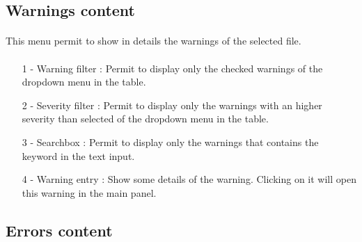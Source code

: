 \documentclass{article}
\begin{document}
\newpage


\subsection{Warnings content}
\vspace{\baselineskip}

\paragraph{}

\vspace{\baselineskip}

\paragraph{}
This menu permit to show in details the warnings of the selected file.

\paragraph{}
\begin{itemize}
	\item[1 -] Warning filter : Permit to display only the checked warnings of the dropdown menu in the table.
    \item[2 -] Severity filter : Permit to display only the warnings with an higher severity than selected of the dropdown menu in the table.
    \item[3 -] Searchbox : Permit to display only the warnings that contains the keyword in the text input.
    \item[4 -] Warning entry : Show some details of the warning. Clicking on it will open this warning in the main panel.
\end{itemize}

\newpage


\subsection{Errors content}
\vspace{\baselineskip}
\end{document}
